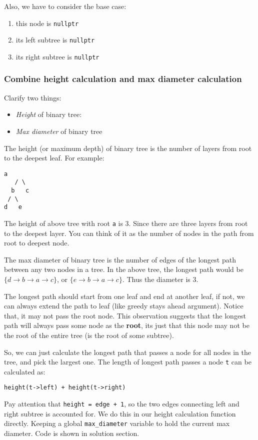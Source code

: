 \documentclass[11pt]{article}
\begin{document}
Also, we have to consider the base case:
\begin{enumerate}
\item this node is \texttt{nullptr}
\item its left subtree is \texttt{nullptr}
\item its right subtree is \texttt{nullptr}
\end{enumerate}
\subsubsection{Combine height calculation and max diameter calculation}
\label{sec:orgb7e209d}
Clarify two things:
\begin{itemize}
\item \emph{Height} of binary tree:
\item \emph{Max diameter} of binary tree
\end{itemize}

The height (or maximum depth) of binary tree is the number of layers from root to the deepest leaf. For example:
\begin{Verbatim}[frame=single]
    a
   / \
  b   c
 / \
d   e
\end{Verbatim}
The height of above tree with root \texttt{a} is \(3\). Since there are three layers from root to the deepest layer. You can think of it as the number of nodes in the path from root to deepest node.

The max diameter of binary tree is the number of edges of the longest path between any two nodes in a tree. In the above tree, the longest path would be \(\{d \rightarrow b \rightarrow a \rightarrow c\}\), or \(\{e \rightarrow b \rightarrow a \rightarrow c\}\). Thus the diameter is \(3\).

The longest path should start from one leaf and end at another leaf, if not, we can always extend the path to leaf (like greedy stays ahead argument). Notice that, it may not pass the root node. This observation suggests that the longest path will always pass some node as the \textbf{root}, its just that this node may not be the root of the entire tree (is the root of some subtree).

So, we can just calculate the longest path that passes a node for all nodes in the tree, and pick the largest one. The length of longest path passes a node \texttt{t} can be calculated as:
\begin{Verbatim}[frame=single]
height(t->left) + height(t->right)
\end{Verbatim}
Pay attention that \texttt{height = edge + 1}, so the two edges connecting left and right subtree is accounted for. We do this in our height calculation function directly. Keeping a global \texttt{max\_diameter} variable to hold the current max diameter. Code is shown in solution section.
\end{document}
